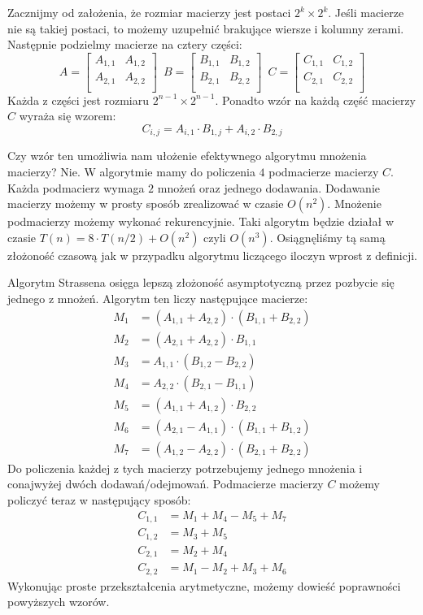 Zacznijmy od założenia, że rozmiar macierzy jest postaci $2^k \times 2^k$.
Jeśli macierze nie są takiej postaci, to możemy uzupełnić brakujące wiersze i kolumny zerami.
Następnie podzielmy macierze na cztery części:
\[
  A = 
  \begin{bmatrix}
    A_{1,1} & A_{1,2} \\
    A_{2,1} & A_{2,2} \\
  \end{bmatrix} \enspace  
  B = 
  \begin{bmatrix}
    B_{1,1} & B_{1,2} \\
    B_{2,1} & B_{2,2} \\
  \end{bmatrix} \enspace
  C = 
  \begin{bmatrix}
    C_{1,1} & C_{1,2} \\
    C_{2,1} & C_{2,2} \\
  \end{bmatrix}
\]
Każda z części jest rozmiaru $2^{n-1} \times 2^{n-1}$.
Ponadto wzór na każdą część macierzy $C$ wyraża się wzorem:
\[
 C_{i,j} = A_{i,1} \cdot B_{1,j} + A_{i,2} \cdot B_{2,j}
\]

Czy wzór ten umożliwia nam ułożenie efektywnego algorytmu mnożenia macierzy?
Nie.
W algorytmie mamy do policzenia $4$ podmacierze macierzy $C$.
Każda podmacierz wymaga $2$ mnożeń oraz jednego dodawania.
Dodawanie macierzy możemy w prosty sposób zrealizować w czasie $O(n^2)$.
Mnożenie podmacierzy możemy wykonać rekurencyjnie.
Taki algorytm będzie działał w czasie $T(n) = 8\cdot T(n/2) + O(n^2)$ czyli $O(n^3)$.
Osiągnęliśmy tą samą złożoność czasową jak w przypadku algorytmu liczącego iloczyn wprost z definicji.

Algorytm Strassena osięga lepszą złożoność asymptotyczną przez pozbycie się jednego z mnożeń.
Algorytm ten liczy następujące macierze:
\begin{align*}
 M_1 &= (A_{1,1} + A_{2,2}) \cdot (B_{1,1} + B_{2,2}) \\
 M_2 &= (A_{2,1} + A_{2,2}) \cdot B_{1,1} \\
 M_3 &= A_{1,1} \cdot (B_{1,2} - B_{2,2}) \\
 M_4 &= A_{2,2} \cdot (B_{2,1} - B_{1,1}) \\
 M_5 &= (A_{1,1} + A_{1,2}) \cdot B_{2,2} \\
 M_6 &= (A_{2,1} - A_{1,1}) \cdot (B_{1,1} + B_{1,2}) \\
 M_7 &= (A_{1,2} - A_{2,2}) \cdot (B_{2,1} + B_{2,2})
\end{align*}
Do policzenia każdej z tych macierzy potrzebujemy jednego mnożenia i conajwyżej dwóch dodawań/odejmowań.
Podmacierze macierzy $C$ możemy policzyć teraz w następujący sposób:
\begin{align*}
 C_{1,1} &= M_1 + M_4 - M_5 + M_7 \\
 C_{1,2} &= M_3 + M_5 \\
 C_{2,1} &= M_2 + M_4 \\
 C_{2,2} &= M_1 - M_2 + M_3 + M_6
\end{align*}
Wykonując proste przekształcenia arytmetyczne, możemy dowieść poprawności powyższych wzorów.

